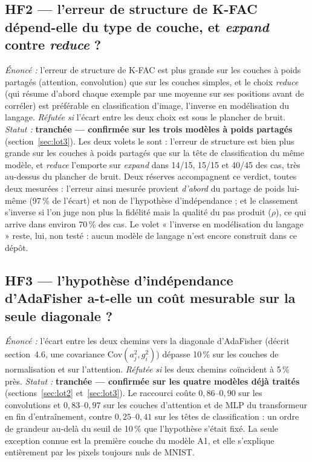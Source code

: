\documentclass[11pt,a4paper]{article}
\newcommand{\eng}[1]{\emph{#1}}
\begin{document}
\subsection*{HF2 — l'erreur de structure de K-FAC dépend-elle du type de couche, et \eng{expand} contre \eng{reduce} ?}
\textit{Énoncé :} l'erreur de structure de K-FAC est plus grande sur les couches à poids partagés
(attention, convolution) que sur les couches simples, et le choix \eng{reduce} (qui résume d'abord
chaque exemple par une moyenne sur ses positions avant de corréler) est préférable en classification
d'image, l'inverse en modélisation du langage. \textit{Réfutée si} l'écart entre les deux choix est
sous le plancher de bruit. \textit{Statut :} \textbf{tranchée — confirmée sur les trois modèles à
poids partagés} (section~\ref{sec:lot3}). Les deux volets le sont : l'erreur de structure est bien
plus grande sur les couches à poids partagés que sur la tête de classification du même modèle, et
\eng{reduce} l'emporte sur \eng{expand} dans 14/15, 15/15 et 40/45 des cas, très au-dessus du
plancher de bruit. Deux réserves accompagnent ce verdict, toutes deux mesurées : l'erreur ainsi
mesurée provient \emph{d'abord} du partage de poids lui-même (97\,\% de l'écart) et non de
l'hypothèse d'indépendance ; et le classement s'inverse si l'on juge non plus la fidélité mais la
qualité du pas produit ($\rho$), ce qui arrive dans environ 70\,\% des cas. Le volet « l'inverse
en modélisation du langage » reste, lui, non testé : aucun modèle de langage n'est encore construit
dans ce dépôt.

\subsection*{HF3 — l'hypothèse d'indépendance d'AdaFisher a-t-elle un coût mesurable sur la seule diagonale ?}
\textit{Énoncé :} l'écart entre les deux chemins vers la diagonale d'AdaFisher (décrit
section~4.6, une covariance $\mathrm{Cov}(a_j^2,g_i^2)$) dépasse 10\,\% sur les couches de
normalisation et sur l'attention. \textit{Réfutée si} les deux chemins coïncident à 5\,\% près.
\textit{Statut :} \textbf{tranchée — confirmée sur les quatre modèles déjà traités}
(sections~\ref{sec:lot2} et~\ref{sec:lot3}). Le raccourci coûte $0{,}86$--$0{,}90$ sur les
convolutions et $0{,}83$--$0{,}97$ sur les couches d'attention et de MLP du transformeur en fin
d'entraînement, contre $0{,}25$--$0{,}41$ sur les têtes de classification : un ordre de grandeur
au-delà du seuil de 10\,\% que l'hypothèse s'était fixé. La seule exception connue est la première
couche du modèle A1, et elle s'explique entièrement par les pixels toujours nuls de MNIST.
\end{document}
